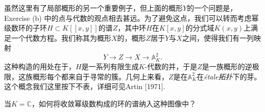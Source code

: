 虽然这里有了局部概形的另一个重要例子，但上面的概形$Y$的一个问题是，Exercise {\theexe} (b) 中的点与代数的观点相去甚远。为了避免这点，我们可以转而考虑幂级数环的子环$H\subset K[\![x,y]\!]$的谱$Z$，其中环$H$在$K[x,y]$的分式域$K(x,y)$上满足一个代数方程。我们称其为概形$X$的，概形$Z$居于$Y$与$X$之间，使得我们有一列映射
\[
	Y\to Z\to X\to \mathbb{A}_K^2.
\]
这种构造的用处在于，$H$是一系列有限生成$K$\hyp 代数的并，于是$Z$是一族概形的逆极限，这族概形每个都来自于寻常的簇。几何上来看，$Z$是在$\mathbb{A}_K^2$在\textit{\'{e}tale拓扑}下的芽。这个概念我们这里按下不表，详细可见Artin [1971].

\begin{exe}
	当$K=\mathbb{C}$，如何将收敛幂级数构成的环的谱纳入这种图像中？
\end{exe}